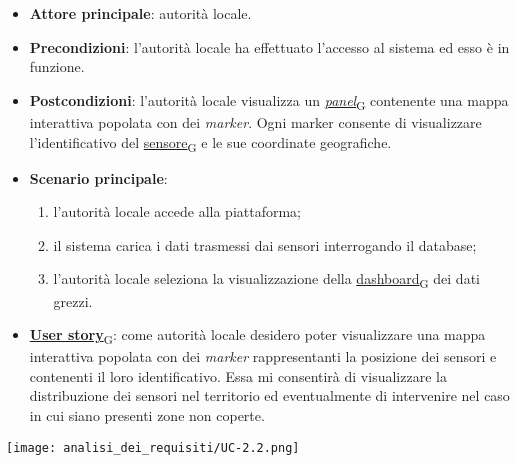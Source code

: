 \begin{itemize}
	\item \textbf{Attore principale}: autorità locale.
	\item \textbf{Precondizioni}: l'autorità locale ha effettuato l'accesso al sistema ed esso è in funzione.
	\item \textbf{Postcondizioni}: l'autorità locale visualizza un \href{https://7last.github.io/docs/pb/documentazione-interna/glossario\#panel}{\textit{panel}\textsubscript{G}} contenente una mappa interattiva
	      popolata con dei \textit{marker}. Ogni marker consente di visualizzare l'identificativo del \href{https://7last.github.io/docs/pb/documentazione-interna/glossario\#sensore}{sensore\textsubscript{G}} e le sue coordinate geografiche.
	\item \textbf{Scenario principale}:
	      \begin{enumerate}
		      \item l'autorità locale accede alla piattaforma;
		      \item il sistema carica i dati trasmessi dai sensori interrogando il database;
		      \item l'autorità locale seleziona la visualizzazione della \href{https://7last.github.io/docs/pb/documentazione-interna/glossario\#dashboard}{dashboard\textsubscript{G}} dei dati grezzi.
	      \end{enumerate}
	\item \href{https://7last.github.io/docs/pb/documentazione-interna/glossario\#user-story}{\textbf{User story}\textsubscript{G}}: come autorità locale desidero poter visualizzare una mappa interattiva popolata con dei \textit{marker} rappresentanti
	      la posizione dei sensori e contenenti il loro identificativo. Essa mi consentirà di visualizzare la distribuzione dei sensori nel territorio
	      ed eventualmente di intervenire nel caso in cui siano presenti zone non coperte.
\end{itemize}
\begin{center}
	\texttt{[image: analisi\_dei\_requisiti/UC-2.2.png]}
\end{center}


